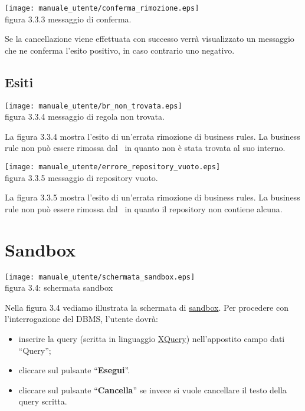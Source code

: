 \begin{center}
\texttt{[image: manuale\_utente/conferma\_rimozione.eps]}\\
 figura 3.3.3 messaggio di conferma.
\end{center} 

Se la cancellazione viene effettuata con successo verr\`a visualizzato un messaggio che ne conferma l'esito positivo, in caso contrario uno negativo.
\subsection{Esiti}
 
\begin{center}
\texttt{[image: manuale\_utente/br\_non\_trovata.eps]}\\
 figura 3.3.4 messaggio di regola non trovata.
\end{center} 
La figura 3.3.4 mostra l'esito di un'errata rimozione di business rules. La business rule non pu\`o essere rimossa dal \rp\ in quanto non \`e stata trovata al suo interno.

\begin{center}
\texttt{[image: manuale\_utente/errore\_repository\_vuoto.eps]}\\
 figura 3.3.5 messaggio di repository vuoto.
\end{center} 
La figura 3.3.5 mostra l'esito di un'errata rimozione di business rules. La business rule non pu\`o essere rimossa dal \rp\ in quanto il repository non contiene alcuna.

\section{Sandbox}
\begin{center}
 \texttt{[image: manuale\_utente/schermata\_sandbox.eps]} \\
 figura 3.4: schermata sandbox
\end{center}
Nella figura 3.4 vediamo illustrata la schermata di \underline{sandbox}. Per procedere con l'interrogazione del DBMS, l'utente dovr\`a:
\begin{itemize}
\item inserire la query (scritta in linguaggio \underline{XQuery}) nell'appostito campo dati ``Query'';
\item cliccare sul pulsante ``\textbf{Esegui}''.
\item cliccare sul pulsante ``\textbf{Cancella}'' se invece si vuole cancellare il testo della query scritta.
\end{itemize}

